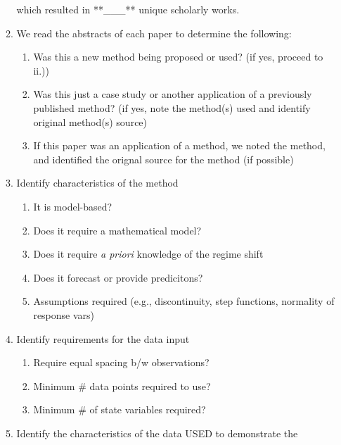 \documentclass[12pt,twoside]{reedthesis}
\providecommand{\tightlist}{%
  \setlength{\itemsep}{0pt}\setlength{\parskip}{0pt}}
\begin{document}
\begin{enumerate}
\begin{enumerate}
    which resulted in **\_\_\_** unique scholarly works.\\
  \item
    We read the abstracts of each paper to determine the following:
    \begin{enumerate}
    \def\labelenumiii{\alph{enumiii}.}
    \tightlist
    \item
      Was this a new method being proposed or used? (if yes, proceed to
      ii.))\\
    \item
      Was this just a case study or another application of a previously
      published method? (if yes, note the method(s) used and identify
      original method(s) source)\\
    \item
      If this paper was an application of a method, we noted the method,
      and identified the orignal source for the method (if possible)\\
    \end{enumerate}
  \item
    Identify characteristics of the method
    \begin{enumerate}
    \def\labelenumiii{\alph{enumiii}.}
    \setcounter{enumiii}{2}
    \tightlist
    \item
      It is model-based?\\
    \item
      Does it require a mathematical model?
    \item
      Does it require \emph{a priori} knowledge of the regime shift
    \item
      Does it forecast or provide predicitons?
    \item
      Assumptions required (e.g., discontinuity, step functions,
      normality of response vars)
    \end{enumerate}
  \item
    Identify requirements for the data input
    \begin{enumerate}
    \def\labelenumiii{\alph{enumiii}.}
    \tightlist
    \item
      Require equal spacing b/w observations?
    \item
      Minimum \# data points required to use?
    \item
      Minimum \# of state variables required?
    \end{enumerate}
  \item
    Identify the characteristics of the data USED to demonstrate the

\end{enumerate}
\end{enumerate}
\end{document}
